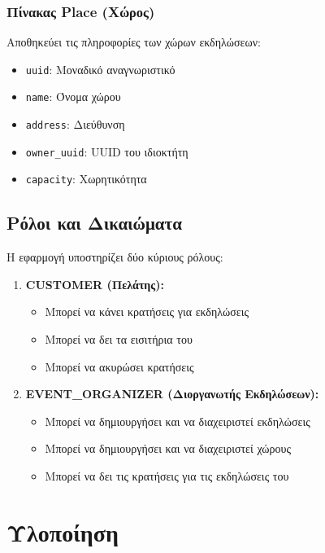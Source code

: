 \documentclass[12pt,a4paper]{report}
\begin{document}
\subsection{Πίνακας Place (Χώρος)}
Αποθηκεύει τις πληροφορίες των χώρων εκδηλώσεων:
\begin{itemize}
    \item \texttt{uuid}: Μοναδικό αναγνωριστικό
    \item \texttt{name}: Όνομα χώρου
    \item \texttt{address}: Διεύθυνση
    \item \texttt{owner\_uuid}: UUID του ιδιοκτήτη
    \item \texttt{capacity}: Χωρητικότητα
\end{itemize}

\section{Ρόλοι και Δικαιώματα}

Η εφαρμογή υποστηρίζει δύο κύριους ρόλους:

\begin{enumerate}
    \item \textbf{CUSTOMER (Πελάτης):}
    \begin{itemize}
        \item Μπορεί να κάνει κρατήσεις για εκδηλώσεις
        \item Μπορεί να δει τα εισιτήρια του
        \item Μπορεί να ακυρώσει κρατήσεις
    \end{itemize}

    \item \textbf{EVENT\_ORGANIZER (Διοργανωτής Εκδηλώσεων):}
    \begin{itemize}
        \item Μπορεί να δημιουργήσει και να διαχειριστεί εκδηλώσεις
        \item Μπορεί να δημιουργήσει και να διαχειριστεί χώρους
        \item Μπορεί να δει τις κρατήσεις για τις εκδηλώσεις του
    \end{itemize}
\end{enumerate}

\newpage

\chapter{Υλοποίηση}
\end{document}

